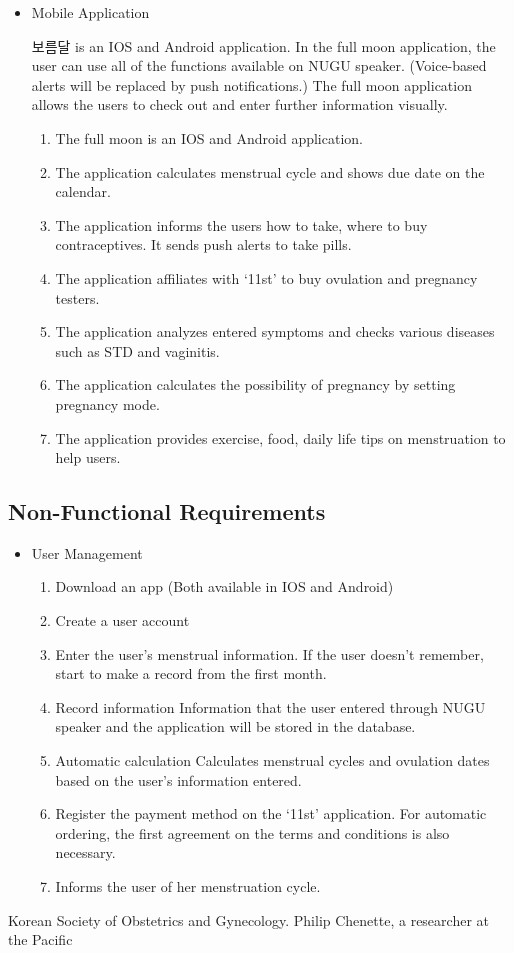 \documentclass[conference]{IEEEtran}
\begin{document}
\begin{itemize}
\item Mobile Application

보름달 is an IOS and Android application. In the full moon application, the user can use all of the functions available on NUGU speaker. (Voice-based alerts will be replaced by push notifications.) The full moon application allows the users to check out and enter further information visually.
\begin{enumerate}
\item The full moon is an IOS and Android application.
\item The application calculates menstrual cycle and shows due date on the calendar. 
\item The application informs the users how to take, where to buy contraceptives. It sends push alerts to take pills.
\item The application affiliates with ‘11st’ to buy ovulation and pregnancy testers.
\item The application analyzes entered symptoms and checks various diseases such as STD and vaginitis.
\item The application calculates the possibility of pregnancy by setting pregnancy mode.
\item The application provides exercise, food, daily life tips on menstruation to help users.
\end{enumerate}
\end{itemize}

\subsection{Non-Functional Requirements}
\begin{itemize}
\item User Management
\begin{enumerate}
\item Download an app (Both available in IOS and Android)
\item Create a user account
\item Enter the user’s menstrual information.
If the user doesn’t remember, start to make a record from the first month.
\item Record information
Information that the user entered through NUGU speaker and the application will be stored in the database.
\item Automatic calculation
Calculates menstrual cycles and ovulation dates based on the user’s information entered.
\item Register the payment method on the ‘11st’ application.
For automatic ordering, the first agreement on the terms and conditions is also necessary.
\item Informs the user of her menstruation cycle.
\end{enumerate}
\end{itemize}

\begin{thebibliography}{00}
 Korean Society of Obstetrics and Gynecology.
 Philip Chenette, a researcher at the Pacific 
\end{thebibliography}
\end{document}
